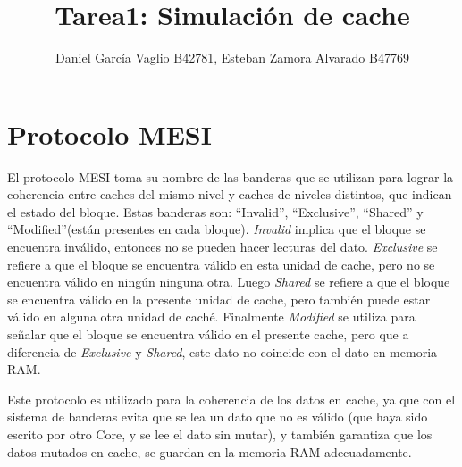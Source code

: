 \documentclass {article}
\begin{document}
\title{Tarea1: Simulación de cache}
\author{Daniel García Vaglio B42781, Esteban Zamora Alvarado B47769}

\maketitle


\section{Protocolo MESI}
El protocolo MESI toma su nombre de las banderas que se utilizan para lograr la coherencia entre
caches del mismo nivel y caches de niveles distintos, que indican el estado del bloque. Estas
banderas son: ``Invalid'', ``Exclusive'', ``Shared'' y ``Modified''(están presentes en cada
bloque). \textit{Invalid} implica que el bloque se encuentra inválido, entonces no se pueden hacer
lecturas del dato. \textit{Exclusive} se refiere a que el bloque se encuentra válido en esta unidad
de cache, pero no se encuentra válido en ningún ninguna otra. Luego \textit{Shared} se refiere a que
el bloque se encuentra válido en la presente unidad de cache, pero también puede estar válido en
alguna otra unidad de caché. Finalmente \textit{Modified} se utiliza para señalar que el bloque se
encuentra válido en el presente cache, pero que a diferencia de \textit{Exclusive} y
\textit{Shared}, este dato no coincide con el dato en memoria RAM.

Este protocolo es utilizado para la coherencia de los datos en cache, ya que con el sistema de
banderas evita que se lea un dato que no es válido (que haya sido escrito por otro Core, y se lee el
dato sin mutar), y también garantiza que los datos mutados en cache, se guardan en la memoria RAM
adecuadamente.
\end{document}
